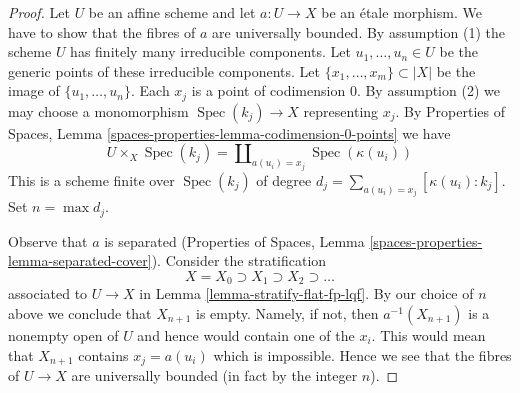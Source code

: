 \documentclass{stacks-project}
\theoremstyle{plain}
\theoremstyle{definition}
\theoremstyle{remark}
\numberwithin{equation}{subsection}
\def\Spec{\mathop{\mathrm{Spec}}}
\begin{document}
\begin{proof}
Let $U$ be an affine scheme and let $a : U \to X$ be an \'etale morphism.
We have to show that the fibres of $a$ are universally bounded. By
assumption (1) the scheme $U$ has finitely many irreducible components.
Let $u_1, \ldots, u_n \in U$ be the generic points of these irreducible
components. Let $\{x_1, \ldots, x_m\} \subset |X|$ be the image
of $\{u_1, \ldots, u_n\}$. Each $x_j$ is a point of codimension $0$.
By assumption (2) we may choose a monomorphism $\Spec(k_j) \to X$
representing $x_j$. By Properties of Spaces, Lemma
\ref{spaces-properties-lemma-codimension-0-points} we have
$$
U \times_X \Spec(k_j) = \coprod\nolimits_{a(u_i) = x_j} \Spec(\kappa(u_i))
$$
This is a scheme finite over $\Spec(k_j)$ of degree
$d_j = \sum_{a(u_i) = x_j} [\kappa(u_i) : k_j]$. Set $n = \max d_j$.

\medskip\noindent
Observe that $a$ is separated
(Properties of Spaces, Lemma \ref{spaces-properties-lemma-separated-cover}).
Consider the stratification
$$
X = X_0 \supset X_1 \supset X_2 \supset \ldots
$$
associated to $U \to X$ in Lemma \ref{lemma-stratify-flat-fp-lqf}.
By our choice of $n$ above we conclude that $X_{n + 1}$ is empty.
Namely, if not, then $a^{-1}(X_{n + 1})$ is a nonempty open
of $U$ and hence would contain one of the $x_i$. This would mean
that $X_{n + 1}$ contains $x_j = a(u_i)$ which is impossible.
Hence we see that the fibres of $U \to X$ are universally bounded
(in fact by the integer $n$).
\end{proof}
\end{document}
